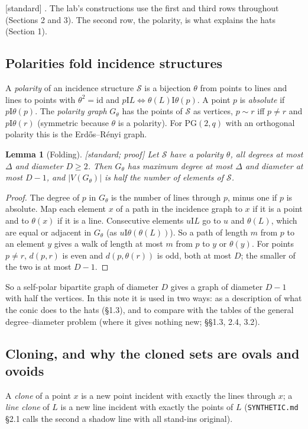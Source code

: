 \documentclass[11pt]{amsart}
\newtheorem{lemma}[theorem]{Lemma}
\theoremstyle{definition}
\theoremstyle{remark}
\newcommand{\I}{\mathrel{\mathrm{I}}}
\newcommand{\cS}{\mathcal{S}}
\newcommand{\PG}{\mathrm{PG}}
\newcommand{\status}[1]{\textup{[#1]}}
\begin{document}
\noindent \status{standard} \cite{VM98,PT,Th81,BGS06}. The lab's constructions use the first and third rows
throughout (Sections 2 and 3). The second row, the polarity, is what explains the hats (Section 1).

\subsection{Polarities fold incidence structures}\label{ssec:fold}
A \emph{polarity} of an incidence structure $\cS$ is a bijection $\theta$ from points to lines and lines to points
with $\theta^2=\mathrm{id}$ and $p\I L\iff\theta(L)\I\theta(p)$. A point $p$ is \emph{absolute} if $p\I\theta(p)$.
The \emph{polarity graph} $G_\theta$ has the points of $\cS$ as vertices, $p\sim r$ iff $p\ne r$ and $p\I\theta(r)$
(symmetric because $\theta$ is a polarity). For $\PG(2,q)$ with an orthogonal polarity this is the Erd\H{o}s--R\'enyi
graph.

\begin{lemma}[Folding]\label{lem:fold}
\status{standard; proof} Let $\cS$ have a polarity $\theta$, all degrees at most $\Delta$ and diameter $D\ge2$. Then
$G_\theta$ has maximum degree at most $\Delta$ and diameter at most $D-1$, and $|V(G_\theta)|$ is half the number of
elements of $\cS$.
\end{lemma}
\begin{proof}
The degree of $p$ in $G_\theta$ is the number of lines through $p$, minus one if $p$ is absolute. Map each element
$x$ of a path in the incidence graph to $x$ if it is a point and to $\theta(x)$ if it is a line. Consecutive elements
$u\I L$ go to $u$ and $\theta(L)$, which are equal or adjacent in $G_\theta$ (as $u\I\theta(\theta(L))$). So a path
of length $m$ from $p$ to an element $y$ gives a walk of length at most $m$ from $p$ to $y$ or $\theta(y)$. For points
$p\ne r$, $d(p,r)$ is even and $d(p,\theta(r))$ is odd, both at most $D$; the smaller of the two is at most $D-1$.
\end{proof}

So a self-polar bipartite graph of diameter $D$ gives a graph of diameter $D-1$ with half the vertices. In this
note it is used in two ways: as a description of what the conic does to the hats (\S1.3), and to compare with the
tables of the general degree--diameter problem (where it gives nothing new; \S\S1.3, 2.4, 3.2).

\subsection{Cloning, and why the cloned sets are ovals and ovoids}\label{ssec:clone}
A \emph{clone} of a point $x$ is a new point incident with exactly the lines through $x$; a \emph{line clone} of $L$
is a new line incident with exactly the points of $L$ (\texttt{SYNTHETIC.md} \S2.1 calls the second a shadow line
with all stand-ins original).
\end{document}
